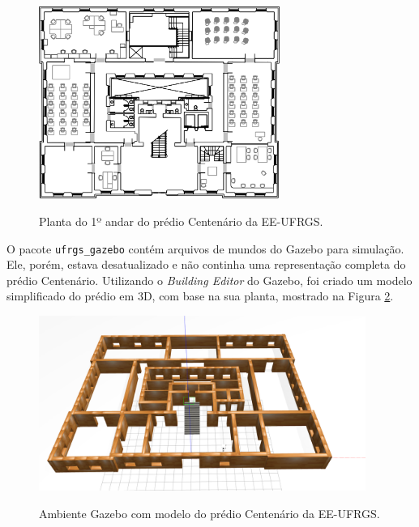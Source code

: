 \documentclass[repeatfields,xlists,xpacks,oneside,yearsonly]{ufrgscca}
\begin{document}
\begin{figure}[h]
    {
        \centering
        \caption{Planta do 1º andar do prédio Centenário da EE-UFRGS.}
        \label{fig:planta_centenario}
        \includegraphics[width=0.7\textwidth]{centenario_floor_plan.png}\\
    }
    {}
\end{figure}

O pacote \texttt{ufrgs\_gazebo} contém arquivos de mundos do Gazebo
para simulação. Ele, porém, estava desatualizado e não continha uma
representação completa do prédio Centenário. Utilizando o
\textit{Building Editor} do Gazebo, foi criado um modelo simplificado
do prédio em 3D, com base na sua planta, mostrado na Figura
\ref{fig:gazebo_centenario}.

\begin{figure}[h]
    {
        \centering
        \caption{Ambiente Gazebo com modelo do prédio Centenário da EE-UFRGS.}
        \label{fig:gazebo_centenario}
        \includegraphics[width=0.95\textwidth]{gazebo.png}\\
    }
\end{figure}
\end{document}
